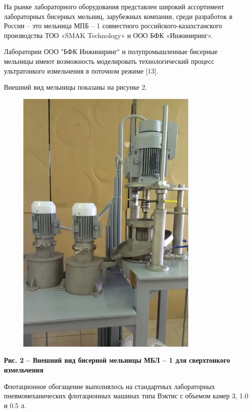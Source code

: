 На рынке лабораторного оборудования представлен широкий ассортимент
лабораторных бисерных мельниц, зарубежных компании, среди разработок в
России -- это мельница МПБ -- 1 совместного российского-казахстанского
производства ТОО «SMAK Technology» и ООО БФК «Инжиниринг».

Лаборатории ООО "БФК Инжиниринг" и полупромышленные бисерные мельницы
имеют возможность моделировать технологический процесс ультратонкого
измельчения в поточном режиме {[}13{]}.

Внешний вид мельницы показаны на рисунке 2.

\begin{figure}[H]
	\centering
	\includegraphics[width=0.8\textwidth]{assets/300}
	\caption*{}
\end{figure}

{\bfseries Рис. 2 -- Внешний вид бисерной мельницы МБЛ -- 1 для
сверхтонкого измельчения}

Флотационное обогащение выполнялось на стандартных лабораторных
пневмомеханических флотационных машинах типа Вэктис с объемом камер 3,
1.0 и 0.5 л.

